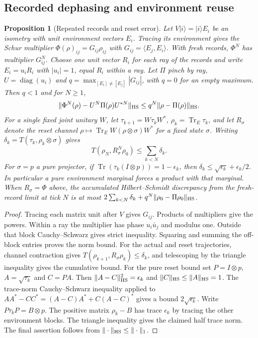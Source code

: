 \documentclass[aps,pra,onecolumn,superscriptaddress,nofootinbib,10pt]{revtex4-2}
\newtheorem{proposition}[theorem]{Proposition}
\theoremstyle{definition}
\theoremstyle{remark}
\newcommand{\tr}{\operatorname{Tr}}
\begin{document}
\subsection{Recorded dephasing and environment reuse}\label{ob:environments}

\begin{proposition}[Repeated records and reset error]\label{ob:records}
Let $V|i\rangle=|i\rangle E_i$ be an isometry with unit environment
vectors $E_i$. Tracing its environment gives the Schur multiplier
$\Phi(\rho)_{ij}=G_{ij}\rho_{ij}$ with $G_{ij}=\langle E_j,E_i\rangle$.
With fresh records, $\Phi^N$ has multiplier $G_{ij}^N$.
Choose one unit vector $R_i$ for each ray of the records and write
$E_i=u_iR_i$ with $|u_i|=1$, equal $R_i$ within a ray.
Let $\Pi$ pinch by ray, $U=\operatorname{diag}(u_i)$ and
$q=\max_{[E_i]\ne[E_j]}|G_{ij}|$, with $q=0$ for an empty maximum.
Then $q<1$ and for $N\ge1$,
\[
 \|\Phi^N(\rho)-U^N\Pi(\rho)U^{*N}\|_{\rm HS}
 \le q^N\|\rho-\Pi(\rho)\|_{\rm HS}.
\]
For a single fixed joint unitary $W$, let $\tau_{k+1}=W\tau_kW^*$,
$\rho_k=\tr_E\tau_k$, and let $R_\sigma$ denote the reset channel
$\rho\mapsto\tr_E W(\rho\otimes\sigma)W^*$ for a fixed state $\sigma$.
Writing $\delta_k=T(\tau_k,\rho_k\otimes\sigma)$ gives
\[
 T(\rho_N,R_\sigma^N\rho_0)\le\sum_{k<N}\delta_k.
\]
For $\sigma=p$ a pure projector, if $\tr(\tau_k(I\otimes p))=1-\epsilon_k$,
then $\delta_k\le\sqrt{\epsilon_k}+\epsilon_k/2$.
In particular a pure environment marginal forces a product with that
marginal. When $R_\sigma=\Phi$ above, the accumulated
Hilbert--Schmidt discrepancy from the fresh-record limit at tick $N$
is at most $2\sum_{k<N}\delta_k+q^N\|\rho_0-\Pi\rho_0\|_{\rm HS}$.
\end{proposition}
\begin{proof}
Tracing each matrix unit after $V$ gives $G_{ij}$.
Products of multipliers give the powers. Within a ray the multiplier
has phase $u_i\bar u_j$ and modulus one. Outside that block
Cauchy--Schwarz gives strict inequality. Squaring and summing the
off-block entries proves the norm bound. For the actual and reset
trajectories, channel contraction gives
$T(\rho_{k+1},R_\sigma\rho_k)\le\delta_k$, and telescoping by the
triangle inequality gives the cumulative bound.
For the pure reset bound set $P=I\otimes p$, $A=\sqrt{\tau_k}$
and $C=PA$. Then $\|A-C\|_{\rm HS}^2=\epsilon_k$ and
$\|C\|_{\rm HS}\le\|A\|_{\rm HS}=1$. The trace-norm
Cauchy--Schwarz inequality applied to
$AA^*-CC^*=(A-C)A^*+C(A-C)^*$ gives a bound $2\sqrt{\epsilon_k}$.
Write $P\tau_kP=B\otimes p$. The positive matrix $\rho_k-B$
has trace $\epsilon_k$ by tracing the other environment blocks.
The triangle inequality gives the claimed half trace norm.
The final assertion follows from $\|\cdot\|_{\rm HS}\le\|\cdot\|_1$.
\end{proof}
\end{document}
